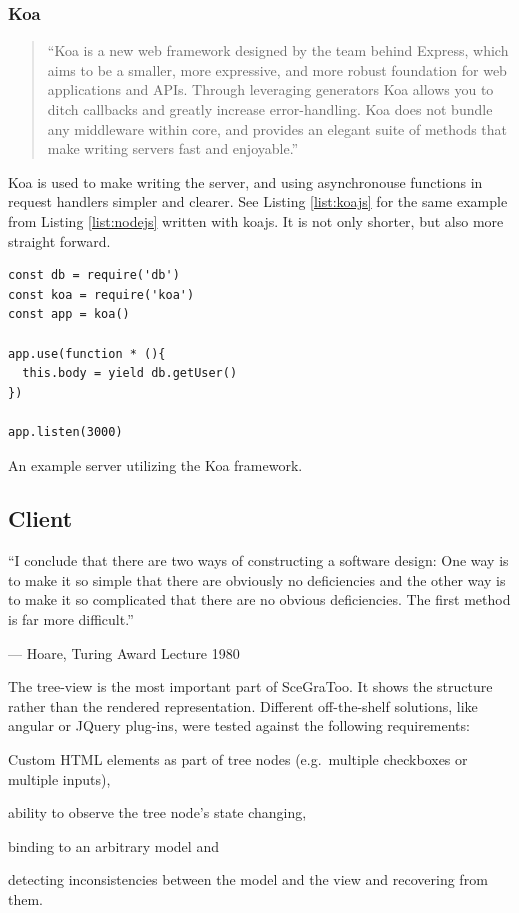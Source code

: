 \subsubsection{Koa}
\label{par:Koa}
\begin{quote}
  ``Koa is a new web framework designed by the team behind Express, which aims to be a smaller, more expressive, and more robust foundation for web applications and APIs. Through leveraging generators Koa allows you to ditch callbacks and greatly increase error-handling. Koa does not bundle any middleware within core, and provides an elegant suite of methods that make writing servers fast and enjoyable.'' \cite{koajs}
\end{quote}

Koa is used to make writing the server, and using asynchronouse functions in request handlers simpler and clearer.
See Listing \ref{list:koajs} for the same example from Listing \ref{list:nodejs} written with koajs.
It is not only shorter, but also more straight forward.

\begin{listing}
  \begin{verbatim}
const db = require('db')
const koa = require('koa')
const app = koa()

app.use(function * (){
  this.body = yield db.getUser()
})

app.listen(3000)
  \end{verbatim}
  \caption{An example server utilizing the Koa framework.}
  \label{list:koajs}
\end{listing}

\subsection{Client}
\label{client}

\epigraph{``I conclude that there are two ways of constructing a software design:
One way is to make it so simple that there are obviously no deficiencies
and the other way is to make it so complicated that there are no obvious
deficiencies. The first method is far more difficult.''}{--- Hoare, Turing Award Lecture 1980}

The tree-view is the most important part of SceGraToo. It shows the
structure rather than the rendered representation. Different
off-the-shelf solutions, like angular or JQuery plug-ins, were tested
against the following requirements:

\begin{enumerate*}
  \item Custom \gls{HTML} elements as part of tree nodes (e.g.~multiple checkboxes or multiple inputs),
  \item ability to observe the tree node's state changing,
  \item binding to an arbitrary model and
  \item detecting inconsistencies between the model and the view and recovering from them.
\end{enumerate*}

